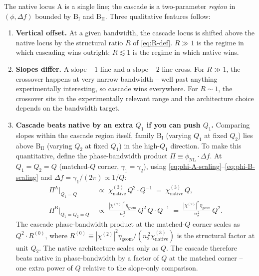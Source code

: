 \documentclass[11pt,a4paper]{article}
\newcommand{\chitwo}{\chi^{(2)}}
\newcommand{\chithree}{\chi^{(3)}}
\begin{document}
The native locus A is a single line; the cascade is a two-parameter
\emph{region} in $(\phi,\Delta f)$ bounded by B$_\text{I}$ and
B$_\text{II}$.  Three qualitative features follow:

\begin{enumerate}
  \item \textbf{Vertical offset.} At a given bandwidth, the cascade
    locus is shifted above the native locus by the structural ratio
    $R$ of \eqref{eq:R-def}.  $R\gg 1$ is the regime in which
    cascading wins outright; $R\lesssim 1$ is the regime in which
    native wins.

  \item \textbf{Slopes differ.} A slope-$-1$ line and a slope-$-2$
    line cross. For $R\gg 1$, the crossover happens at very narrow
    bandwidth -- well past anything experimentally interesting,
    so cascade wins everywhere.  For $R\sim 1$, the crossover sits in
    the experimentally relevant range and the architecture choice
    depends on the bandwidth target.

  \item \textbf{Cascade beats native by an extra $Q_1$ if you can push
    $Q_1$.}  Comparing slopes within the cascade region itself,
    family B$_\text{I}$ (varying $Q_1$ at fixed $Q_2$) lies above
    B$_\text{II}$ (varying $Q_2$ at fixed $Q_1$) in the high-$Q_1$
    direction.  To make this quantitative, define the
    phase-bandwidth product $\Pi\equiv\phi_\text{NL}\cdot\Delta f$.
    At $Q_1=Q_2=Q$ (matched-$Q$ corner, $\gamma_1=\gamma_2$), using
    \eqref{eq:phi-A-scaling}--\eqref{eq:phi-B-scaling} and
    $\Delta f=\gamma_1/(2\pi)\propto 1/Q$:
    \begin{align*}
      \Pi^\text{A}\bigl|_{Q_1=Q}
          &\;\propto\;\chithree_\text{native}\,Q^{2}\cdot Q^{-1}
          \;=\;\chithree_\text{native}\,Q,\\
      \Pi^\text{B}\bigl|_{Q_1=Q_2=Q}
          &\;\propto\;\frac{|\chitwo|^{2}\,\eta_\text{geom}}{n_2^{\,2}}\,Q^{2}\,Q
              \cdot Q^{-1}
          \;=\;\frac{|\chitwo|^{2}\,\eta_\text{geom}}{n_2^{\,2}}\,Q^{2}.
    \end{align*}
    The cascade phase-bandwidth product at the matched-$Q$ corner
    scales as $Q^{2}\cdot R^{(0)}$, where
    $R^{(0)}\equiv|\chitwo|^{2}\eta_\text{geom}/(n_2^{\,2}\chithree_\text{native})$
    is the structural factor at unit $Q_2$.  The native architecture
    scales only as $Q$.  The cascade therefore beats native in
    phase-bandwidth by a factor of $Q$ at the matched corner -- one
    extra power of $Q$ relative to the slope-only comparison.
\end{enumerate}
\end{document}
